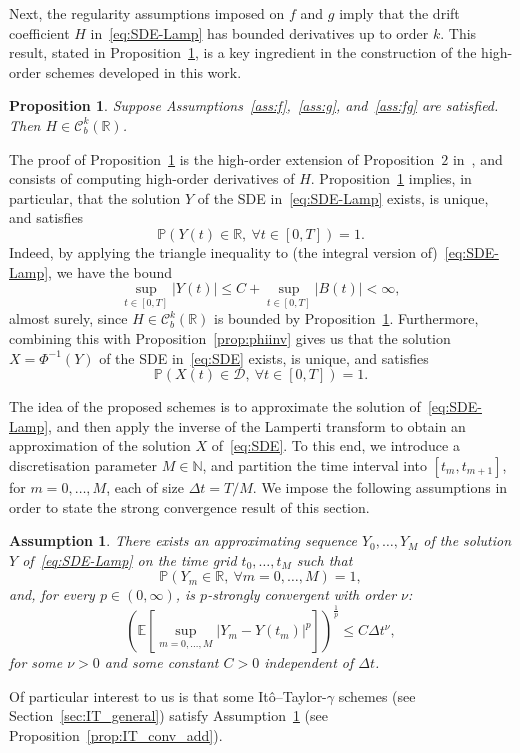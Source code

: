 \documentclass[11pt]{amsart}
\newtheorem{proposition}[theorem]{Proposition}
\newtheorem{assumption}{Assumption}
\newcommand{\E}{{\mathbb E}}
\newcommand{\PP}{{\mathbb P}}
\newcommand{\D}{\mathcal{D}}
\newcommand{\C}{\mathcal{C}}
\begin{document}
{Next, the regularity assumptions imposed on $f$ and $g$ imply that the drift coefficient $H$ in~\eqref{eq:SDE-Lamp} has bounded derivatives up to order $k$. This result, stated in Proposition~\ref{prop:H}, is a key ingredient in the construction of the high-order schemes developed in this work.
\begin{proposition}\label{prop:H}
Suppose Assumptions~\ref{ass:f},~\ref{ass:g}, and~\ref{ass:fg} are satisfied. Then $H \in \C^{k}_{b}(\mathbb{R})$.
\end{proposition}
The proof of Proposition~\ref{prop:H} is the high-order extension of Proposition~$2$ in~\cite{MR4737060}, and consists of computing high-order derivatives of $H$. Proposition~\ref{prop:H} implies, in particular, that the solution $Y$ of the SDE in~\eqref{eq:SDE-Lamp} exists, is unique, and satisfies
\begin{equation}\label{eq:Yt_bounded}
\PP \left( Y(t) \in \mathbb{R},\ \forall t \in [0,T] \right) = 1.
\end{equation}
Indeed, by applying the triangle inequality to (the integral version of)~\eqref{eq:SDE-Lamp}, we have the bound
\begin{equation*}
\sup_{t \in [0,T]} |Y(t)| \leq C + \sup_{t \in [0,T]} |B(t)| < \infty,
\end{equation*}
almost surely, since $H \in \C^{k}_{b}(\mathbb{R})$ is bounded by Proposition~\ref{prop:H}. Furthermore, combining this with Proposition~\ref{prop:phiinv} gives us that the solution $X = \Phi^{-1}(Y)$ of the SDE in~\eqref{eq:SDE} exists, is unique, and satisfies
\begin{equation*}
\PP \left( X(t) \in \D,\ \forall t \in [0,T] \right) = 1.
\end{equation*}

The idea of the proposed schemes is to approximate the solution of~\eqref{eq:SDE-Lamp}, and then apply the inverse of the Lamperti transform to obtain an approximation of the solution $X$ of~\eqref{eq:SDE}. To this end, we introduce a discretisation parameter $M \in \mathbb{N}$, and partition the time interval into $[t_{m},t_{m+1}]$, for $m=0,\ldots,M$, each of size $\Delta t = T/M$. We impose the following assumptions in order to state the strong convergence result of this section.
\begin{assumption}\label{ass:globalStrongInt}
There exists an approximating sequence $Y_{0},\ldots,Y_{M}$ of the solution $Y$ of~\eqref{eq:SDE-Lamp} on the time grid $t_{0},\ldots,t_{M}$ such that
\begin{equation*}
\PP (Y_{m} \in \mathbb{R},\ \forall m = 0,\ldots,M) = 1,
\end{equation*}
and, for every $p \in (0,\infty)$, is $p$-strongly convergent with order $\nu$:
\begin{equation*}
\left( \E \left[ \sup_{m=0, \ldots, M} | Y_{m} - Y(t_{m}) |^{p} \right] \right)^{\frac{1}{p}} \leq C \Delta t^{\nu},
\end{equation*}
for some $\nu>0$ and some constant $C>0$ independent of $\Delta t$.
\end{assumption}
Of particular interest to us is that some Itô--Taylor-$\gamma$ schemes (see Section~\ref{sec:IT_general}) satisfy Assumption~\ref{ass:globalStrongInt} (see Proposition~\ref{prop:IT_conv_add}). 

}
\end{document}
